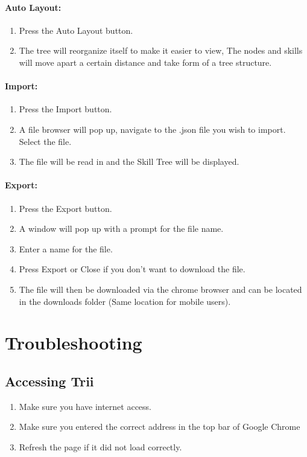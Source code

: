 \documentclass[12pt]{article}
\begin{document}
\paragraph{Auto Layout:}
\begin{enumerate}
	\item Press the Auto Layout button.
	\item The tree will reorganize itself to make it easier to view, The nodes and skills will move apart a certain distance and take form of a tree structure.
\end{enumerate}

\paragraph{Import:}
\begin{enumerate}
	\item Press the Import button.
	\item A file browser will pop up, navigate to the .json file you wish to import. Select the file.
	\item The file will be read in and the Skill Tree will be displayed.
\end{enumerate}

\paragraph{Export:}
\begin{enumerate}
	\item Press the Export button.
	\item A window will pop up with a prompt for the file name.
	\item Enter a name for the file.
	\item Press Export or Close if you don't want to download the file.
	\item The file will then be downloaded via the chrome browser and can be located in the downloads folder (Same location for mobile users).
\end{enumerate}

\newpage
\section{Troubleshooting}
\subsection{Accessing Trii}
    \begin{enumerate}
    	\item Make sure you have internet access.
      \item Make sure you entered the correct address in the top bar of Google Chrome
      \item Refresh the page if it did not load correctly.
    \end{enumerate}
    
\end{document}

